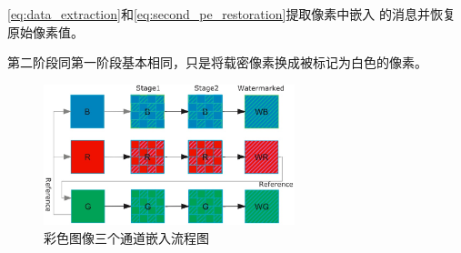 \begin{itemize}
\begin{algorithm}[!h]
\begin{algorithmic}[1]
        \ref{eq:data_extraction}和\ref{eq:second_pe_restoration}提取像素中嵌入
        的消息并恢复原始像素值。
      \end{algorithmic}
    \end{algorithm}
    \vspace{-6mm}
    \par
    第二阶段同第一阶段基本相同，只是将载密像素换成被标记为白色的像素。
    \begin{figure}[!h]
      \centering 
      \includegraphics[width=0.65\textwidth]{figures/three_channel_embedding.jpg}
      \caption{彩色图像三个通道嵌入流程图}
      \label{fig:three_channel_embedding}
    \end{figure}
\end{itemize}



